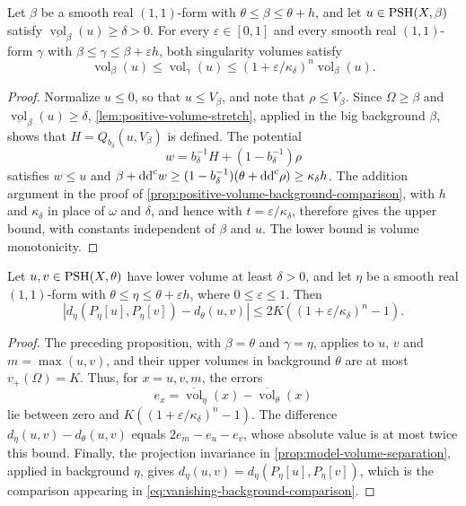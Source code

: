 \begin{proposition}\label{prop:uniform-background-volume-comparison}
Let $\beta$ be a smooth real $(1,1)$-form with $\theta\leq\beta\leq\theta+h$, and let $u\in\mathrm{PSH}(X,\beta)$ satisfy $\underline{\operatorname{vol}}_\beta(u)\geq\delta>0$. For every $\varepsilon\in[0,1]$ and every smooth real $(1,1)$-form $\gamma$ with $\beta\leq\gamma\leq\beta+\varepsilon h$, both singularity volumes satisfy
\[
 \operatorname{vol}_\beta(u)
 \leq\operatorname{vol}_\gamma(u)
 \leq(1+\varepsilon/\kappa_\delta)^n\operatorname{vol}_\beta(u).
\]
\end{proposition}
\begin{proof}
Normalize $u\leq0$, so that $u\leq V_\beta$, and note that $\rho\leq V_\beta$. Since $\Omega\geq\beta$ and $\underline{\operatorname{vol}}_\beta(u)\geq\delta$, \cref{lem:positive-volume-stretch}, applied in the big background $\beta$, shows that $H=Q_{b_\delta}(u,V_\beta)$ is defined. The potential
\[
 w=b_\delta^{-1}H+(1-b_\delta^{-1})\rho
\]
satisfies $w\leq u$ and $\beta+\mathrm{dd}^{\mathrm{c}} w\geq(1-b_\delta^{-1})(\theta+\mathrm{dd}^{\mathrm{c}}\rho)\geq\kappa_\delta h$. The addition argument in the proof of \cref{prop:positive-volume-background-comparison}, with $h$ and $\kappa_\delta$ in place of $\omega$ and $\delta$, and hence with $t=\varepsilon/\kappa_\delta$, therefore gives the upper bound, with constants independent of $\beta$ and $u$. The lower bound is volume monotonicity.
\end{proof}

\begin{corollary}\label{cor:vanishing-background-comparison}
Let $u,v\in\mathrm{PSH}(X,\theta)$ have lower volume at least $\delta>0$, and let $\eta$ be a smooth real $(1,1)$-form with $\theta\leq\eta\leq\theta+\varepsilon h$, where $0\leq\varepsilon\leq1$. Then
\begin{equation}\label{eq:vanishing-background-comparison}
 \left|d_\eta(P_\eta[u],P_\eta[v])-d_\theta(u,v)\right|
 \leq2K\left((1+\varepsilon/\kappa_\delta)^n-1\right).
\end{equation}
\end{corollary}
\begin{proof}
The preceding proposition, with $\beta=\theta$ and $\gamma=\eta$, applies to $u$, $v$ and $m=\max(u,v)$, and their upper volumes in background $\theta$ are at most $v_+(\Omega)=K$. Thus, for $x=u,v,m$, the errors
\[
 e_x=\overline{\operatorname{vol}}_\eta(x)
       -\overline{\operatorname{vol}}_\theta(x)
\]
lie between zero and $K((1+\varepsilon/\kappa_\delta)^n-1)$. The difference $d_\eta(u,v)-d_\theta(u,v)$ equals $2e_m-e_u-e_v$, whose absolute value is at most twice this bound. Finally, the projection invariance in \cref{prop:model-volume-separation}, applied in background $\eta$, gives $d_\eta(u,v)=d_\eta(P_\eta[u],P_\eta[v])$, which is the comparison appearing in \eqref{eq:vanishing-background-comparison}.
\end{proof}


